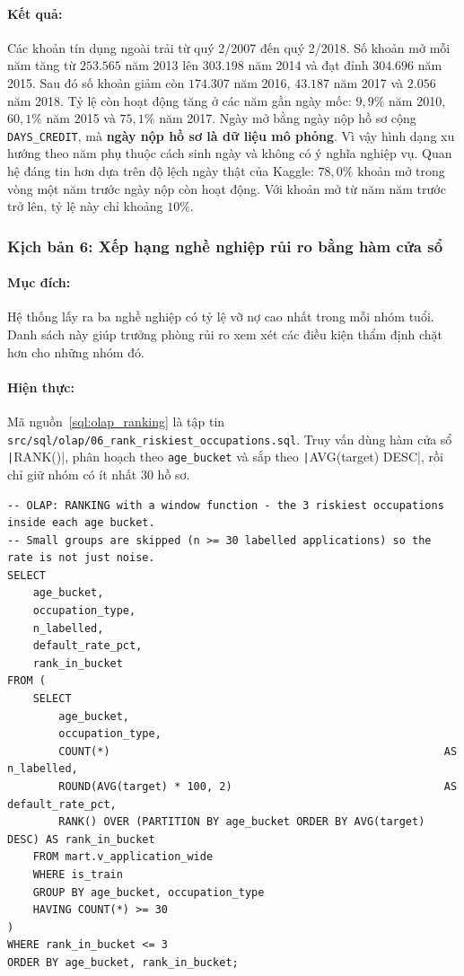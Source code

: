 \paragraph{Kết quả:} Các khoản tín dụng ngoài trải từ quý 2/2007 đến quý 2/2018. Số khoản mở mỗi năm tăng từ $253.565$ năm 2013 lên $303.198$ năm 2014 và đạt đỉnh $304.696$ năm 2015. Sau đó số khoản giảm còn $174.307$ năm 2016, $43.187$ năm 2017 và $2.056$ năm 2018. Tỷ lệ còn hoạt động tăng ở các năm gần ngày mốc: $9{,}9\%$ năm 2010, $60{,}1\%$ năm 2015 và $75{,}1\%$ năm 2017. Ngày mở bằng ngày nộp hồ sơ cộng \texttt{DAYS\_CREDIT}, mà \textbf{ngày nộp hồ sơ là dữ liệu mô phỏng}. Vì vậy hình dạng xu hướng theo năm phụ thuộc cách sinh ngày và không có ý nghĩa nghiệp vụ. Quan hệ đáng tin hơn dựa trên độ lệch ngày thật của Kaggle: $78{,}0\%$ khoản mở trong vòng một năm trước ngày nộp còn hoạt động. Với khoản mở từ năm năm trước trở lên, tỷ lệ này chỉ khoảng $10\%$.

\subsubsection*{Kịch bản 6: Xếp hạng nghề nghiệp rủi ro bằng hàm cửa sổ}
\paragraph{Mục đích:} Hệ thống lấy ra ba nghề nghiệp có tỷ lệ vỡ nợ cao nhất trong mỗi nhóm tuổi. Danh sách này giúp trưởng phòng rủi ro xem xét các điều kiện thẩm định chặt hơn cho những nhóm đó.
\paragraph{Hiện thực:} Mã nguồn~\ref{sql:olap_ranking} là tập tin \texttt{src/sql/olap/}\allowbreak\texttt{06\_rank\_riskiest\_occupations.sql}. Truy vấn dùng hàm cửa sổ \texttt|RANK()|, phân hoạch theo \texttt{age\_bucket} và sắp theo \texttt|AVG(target) DESC|, rồi chỉ giữ nhóm có ít nhất $30$ hồ sơ.

\begin{listing}[H]
	\footnotesize
	\begin{verbatim}
-- OLAP: RANKING with a window function - the 3 riskiest occupations inside each age bucket.
-- Small groups are skipped (n >= 30 labelled applications) so the rate is not just noise.
SELECT
    age_bucket,
    occupation_type,
    n_labelled,
    default_rate_pct,
    rank_in_bucket
FROM (
    SELECT
        age_bucket,
        occupation_type,
        COUNT(*)                                                    AS n_labelled,
        ROUND(AVG(target) * 100, 2)                                 AS default_rate_pct,
        RANK() OVER (PARTITION BY age_bucket ORDER BY AVG(target) DESC) AS rank_in_bucket
    FROM mart.v_application_wide
    WHERE is_train
    GROUP BY age_bucket, occupation_type
    HAVING COUNT(*) >= 30
)
WHERE rank_in_bucket <= 3
ORDER BY age_bucket, rank_in_bucket;
\end{verbatim}
	\caption{Truy vấn xếp hạng ba nghề nghiệp rủi ro nhất mỗi nhóm tuổi}
	\label{sql:olap_ranking}
\end{listing}

